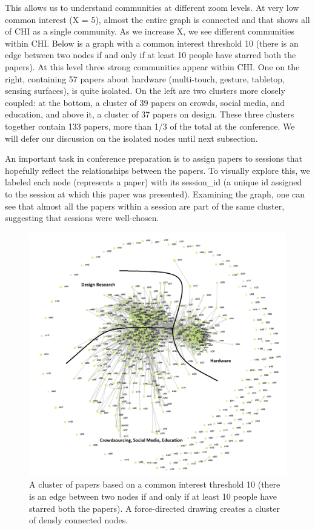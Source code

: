 \documentclass{sigchi}
\begin{document}
This allows us to understand communities at different zoom levels. At very low common interest (X = 5), almost the entire graph is connected and that shows all of CHI as a single community. As we increase X, we see different communities within CHI. Below is a graph with a common interest threshold 10 (there is an edge between two nodes if and only if at least 10 people have starred both the papers). At this level three strong communities appear within CHI.  One on the right, containing 57 papers about hardware (multi-touch, gesture, tabletop, sensing surfaces), is quite isolated.  On the left are two clusters more closely coupled: at the bottom, a cluster of 39 papers on crowds, social media, and education, and above it, a cluster of 37 papers on design.  These three clusters together contain 133 papers, more than 1/3 of the total at the conference.  We will defer our discussion on the isolated nodes until next subsection.


An important task in conference preparation is to assign papers to sessions that hopefully reflect the relationships between the papers.  To visually explore this, we labeled each node (represents a paper) with its session\_id (a unique id assigned to the session at which this paper was presented).  Examining the graph, one can see that almost all the papers within a session are part of the same cluster, suggesting that sessions were well-chosen. 


\begin{figure}[!h]
\centering
\includegraphics[width=0.9\columnwidth]{mychi-community-view-10}
\caption{A cluster of papers based on a common interest threshold 10 (there is an edge between two nodes if and only if at least 10 people have starred both the papers). A force-directed drawing creates a cluster of densly connected nodes. }
\label{fig:Community View of threshold 10}
\end{figure}
\end{document}
